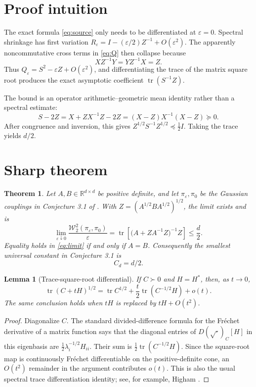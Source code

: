 \documentclass[11pt]{article}
\newtheorem{theorem}{Theorem}
\newtheorem{lemma}{Lemma}
\newcommand{\Tr}{\operatorname{tr}}
\newcommand{\R}{\mathbb{R}}
\newcommand{\W}{\mathcal{W}}
\begin{document}
\section{Proof intuition}

The exact formula \eqref{eq:source} only needs to be differentiated at
$\varepsilon=0$.  Spectral shrinkage has first variation
$R_\varepsilon=I-(\varepsilon/2)Z^{-1}+O(\varepsilon^2)$.  The apparently
noncommutative cross terms in \eqref{eq:Q} then collapse because
\[
  XZ^{-1}Y=YZ^{-1}X=Z.
\]
Thus $Q_\varepsilon=S^2-\varepsilon Z+O(\varepsilon^2)$, and differentiating
the trace of the matrix square root produces the exact asymptotic coefficient
$\Tr(S^{-1}Z)$.

The bound is an operator arithmetic--geometric mean identity rather than a
spectral estimate:
\[
  S-2Z=X+ZX^{-1}Z-2Z=(X-Z)X^{-1}(X-Z)\succeq0.
\]
After congruence and inversion, this gives
$Z^{1/2}S^{-1}Z^{1/2}\preceq \tfrac12 I$.  Taking the trace yields $d/2$.

\section{Sharp theorem}

\begin{theorem}\label{thm:main}
Let $A,B\in\R^{d\times d}$ be positive definite, and let
$\pi_\varepsilon,\pi_0$ be the Gaussian couplings in Conjecture 3.1 of
\cite{yun}.  With $Z=(A^{1/2}BA^{1/2})^{1/2}$, the limit exists and is
\begin{equation}\label{eq:limit}
  \lim_{\varepsilon\downarrow0}
  \frac{\W_2^2(\pi_\varepsilon,\pi_0)}{\varepsilon}
  =\Tr\!\left[
    \bigl(A+ZA^{-1}Z\bigr)^{-1}Z
  \right]
  \le \frac d2.
\end{equation}
Equality holds in \eqref{eq:limit} if and only if $A=B$.  Consequently the
smallest universal constant in Conjecture 3.1 is
\[
  \boxed{C_d=d/2}.
\]
\end{theorem}

\begin{lemma}[Trace-square-root differential]\label{lem:trace-root}
If $C\succ0$ and $H=H^*$, then, as $t\to0$,
\[
  \Tr(C+tH)^{1/2}
  =\Tr C^{1/2}+\frac t2\Tr(C^{-1/2}H)+o(t).
\]
The same conclusion holds when $tH$ is replaced by $tH+O(t^2)$.
\end{lemma}

\begin{proof}
Diagonalize $C$.  The standard divided-difference formula for the
Fr\'echet derivative of a matrix function says that the diagonal entries of
$D(\sqrt{\cdot})_C[H]$ in this eigenbasis are
$\frac12\lambda_i^{-1/2}H_{ii}$.  Their sum is
$\frac12\Tr(C^{-1/2}H)$.  Since the square-root map is continuously
Fr\'echet differentiable on the positive-definite cone, an $O(t^2)$ remainder
in the argument contributes $o(t)$.  This is also the usual spectral trace
differentiation identity; see, for example, Higham \cite[Chapter 3]{higham}.
\end{proof}
\end{document}
